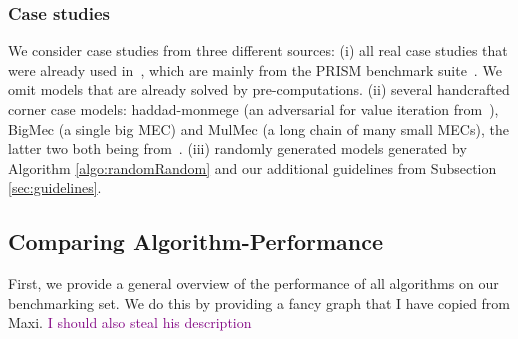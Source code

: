 \subsubsection*{Case studies}
We consider case studies from three different sources: 
(i) all real case studies that were already used in~\cite{gandalf20}, which are mainly from the PRISM benchmark suite~\cite{PRISMben}. We omit models that are already solved by pre-computations.
(ii) several handcrafted corner case models: haddad-monmege (an adversarial for value iteration from~\cite{haddadmonmege}), BigMec (a single big MEC) and MulMec (a long chain of many small MECs), the latter two both being from~\cite{gandalf}.
(iii) randomly generated models generated by Algorithm \ref{algo:randomRandom} and our additional guidelines from Subsection \ref{sec:guidelines}.


\subsection{Comparing Algorithm-Performance}
First, we provide a general overview of the performance of all algorithms on our benchmarking set.
We do this by providing a fancy graph that I have copied from Maxi. \textcolor{purple}{I should also steal his description}

